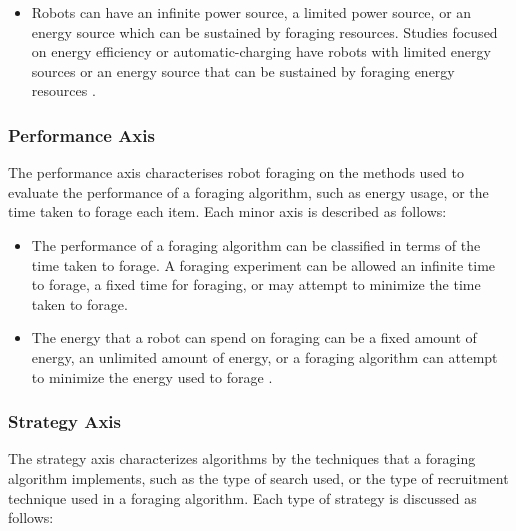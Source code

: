 \begin{itemize}
\item Robots can have an infinite power source, a limited power source, or an energy source which can be sustained by foraging resources. Studies focused on energy efficiency or automatic-charging have robots with limited energy sources or an energy source that can be sustained by foraging energy resources \cite{liu2006strategies}.

\end{itemize}

\subsubsection{Performance Axis}
The performance axis characterises robot foraging on the methods used to evaluate the performance of a foraging algorithm, such as energy usage, or the time taken to forage each item. Each minor axis is described as follows:

\begin{itemize}
\item The performance of a foraging algorithm can be classified in terms of the time taken to forage. A foraging experiment can be allowed an infinite time to forage, a fixed time for foraging, or may attempt to minimize the time taken to forage.
\item The energy that a robot can spend on foraging can be a fixed amount of energy, an unlimited amount of energy, or a foraging algorithm can attempt to minimize the energy used to forage \cite{liu2006strategies}.
\end{itemize}

\subsubsection{Strategy Axis}
The strategy axis characterizes algorithms by the techniques that a foraging algorithm implements, such as the type of search used, or the type of recruitment technique used in a foraging algorithm. Each type of strategy is discussed as follows:

